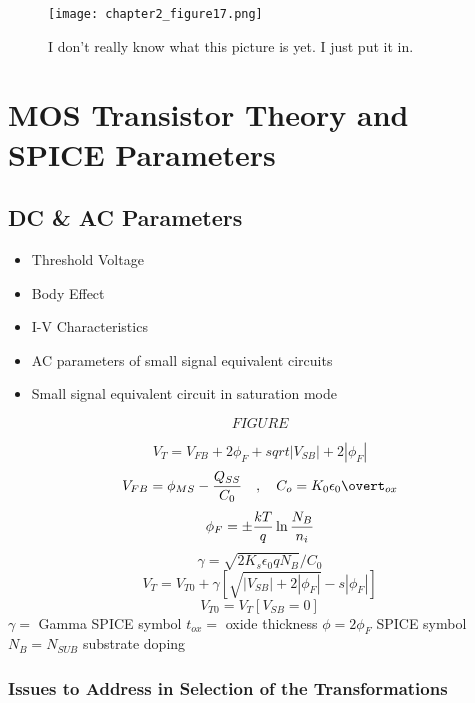 \documentclass[11pt,fleqn]{book} %
\begin{document}
\begin{figure}[h]
  \centering\texttt{[image: chapter2\_figure17.png]}
  \caption{I don't really know what this picture is yet. I just put it in.}
\end{figure}



\chapter{MOS Transistor Theory and SPICE Parameters}

\section{DC \& AC Parameters}

\begin{itemize}
 \item Threshold Voltage
 \item Body Effect
 \item I-V Characteristics
 \item AC parameters of small signal equivalent circuits
 \item Small signal equivalent circuit in saturation mode
\end{itemize}

$$FIGURE$$

$$V_T=V_{FB}+2\phi_F+sqrt{|V_{SB}|+2|\phi_F|}$$
$$V_{FB}=\phi_{MS}-{Q_{SS}\over C_0}\quad,\quad C_o={K_0 \epsilon_0\overt_{ox}}$$
$$\phi_F=\pm{kT\over q}\ln{N_B\over n_i}$$
$$\gamma=\sqrt{2K_s\epsilon_0 qN_B}/C_0$$
$$V_T=V_{T0}+\gamma[\sqrt{|V_{SB}|+2|\phi_F|}-s|\phi_F|]$$
$$V_{T0}=V_T[V_{SB}=0]$$
$\gamma=$ Gamma SPICE symbol
$t_{ox}=$ oxide thickness
$\phi=2\phi_F$ SPICE symbol
$N_B=N_{SUB}$ substrate doping


\subsection{Issues to Address in Selection of the Transformations}

\end{document}
